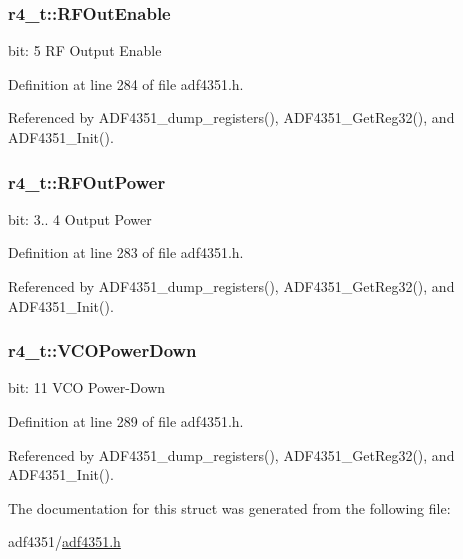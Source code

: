 \subsubsection[{\texorpdfstring{R\+F\+Out\+Enable}{RFOutEnable}}]{ r4\+\_\+t\+::\+R\+F\+Out\+Enable}\hypertarget{structr4__t_adf8eb2db5ffd584ec6c5b5496a90f0f5}{}\label{structr4__t_adf8eb2db5ffd584ec6c5b5496a90f0f5}
bit\+: 5 RF Output Enable 

Definition at line 284 of file adf4351.\+h.



Referenced by A\+D\+F4351\+\_\+dump\+\_\+registers(), A\+D\+F4351\+\_\+\+Get\+Reg32(), and A\+D\+F4351\+\_\+\+Init().

\subsubsection[{\texorpdfstring{R\+F\+Out\+Power}{RFOutPower}}]{ r4\+\_\+t\+::\+R\+F\+Out\+Power}\hypertarget{structr4__t_ade4ee7f86064dd89515558dc5aa138bd}{}\label{structr4__t_ade4ee7f86064dd89515558dc5aa138bd}
bit\+: 3.. 4 Output Power 

Definition at line 283 of file adf4351.\+h.



Referenced by A\+D\+F4351\+\_\+dump\+\_\+registers(), A\+D\+F4351\+\_\+\+Get\+Reg32(), and A\+D\+F4351\+\_\+\+Init().

\subsubsection[{\texorpdfstring{V\+C\+O\+Power\+Down}{VCOPowerDown}}]{ r4\+\_\+t\+::\+V\+C\+O\+Power\+Down}\hypertarget{structr4__t_a144b348686f74ef9a401f2c57f324824}{}\label{structr4__t_a144b348686f74ef9a401f2c57f324824}
bit\+: 11 V\+CO Power-\/\+Down 

Definition at line 289 of file adf4351.\+h.



Referenced by A\+D\+F4351\+\_\+dump\+\_\+registers(), A\+D\+F4351\+\_\+\+Get\+Reg32(), and A\+D\+F4351\+\_\+\+Init().



The documentation for this struct was generated from the following file\+:\begin{DoxyCompactItemize}
\item 
adf4351/\hyperlink{adf4351_8h}{adf4351.\+h}\end{DoxyCompactItemize}
